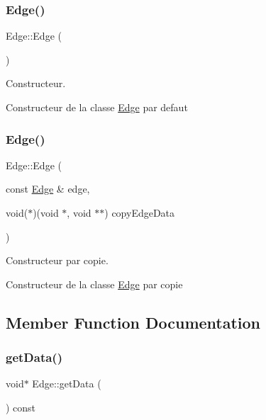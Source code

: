\subsubsection{\texorpdfstring{Edge()}{Edge()}\hspace{0.1cm}{\footnotesize\ttfamily [1/2]}}
{\footnotesize\ttfamily Edge\+::\+Edge (\begin{DoxyParamCaption}{ }\end{DoxyParamCaption})}



Constructeur. 

Constructeur de la classe \mbox{\hyperlink{class_edge}{Edge}} par defaut \mbox{\label{class_edge_a12b460c6c0a255c44d564b033b056b02}} 
\subsubsection{\texorpdfstring{Edge()}{Edge()}\hspace{0.1cm}{\footnotesize\ttfamily [2/2]}}
{\footnotesize\ttfamily Edge\+::\+Edge (\begin{DoxyParamCaption}\item[{const \mbox{\hyperlink{class_edge}{Edge}} \&}]{edge,  }\item[{void($\ast$)(void $\ast$, void $\ast$$\ast$)}]{copy\+Edge\+Data }\end{DoxyParamCaption})}



Constructeur par copie. 

Constructeur de la classe \mbox{\hyperlink{class_edge}{Edge}} par copie 

\subsection{Member Function Documentation}
\mbox{\label{class_edge_a4697368244aec892f29b53be0480fadc}} 
\subsubsection{\texorpdfstring{get\+Data()}{getData()}}
{\footnotesize\ttfamily void$\ast$ Edge\+::get\+Data (\begin{DoxyParamCaption}{ }\end{DoxyParamCaption}) const}



